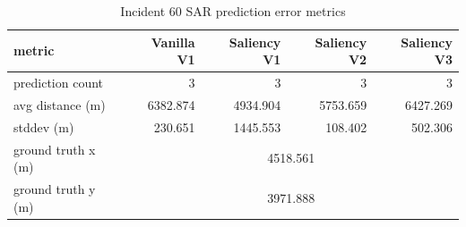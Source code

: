 \begin{table}[ht]
\centering
\caption{Incident 60 SAR prediction error metrics}
\label{tab:sar-incident-60}
\begin{tabular}{lrrrr}
\hline
metric & Vanilla V1 & Saliency V1 & Saliency V2 & Saliency V3 \\
\hline
prediction count & 3 & 3 & 3 & 3 \\
avg distance (m) & 6382.874 & 4934.904 & 5753.659 & 6427.269 \\
stddev (m) & 230.651 & 1445.553 & 108.402 & 502.306 \\
ground truth x (m) & \multicolumn{4}{c}{4518.561} \\
ground truth y (m) & \multicolumn{4}{c}{3971.888} \\
\hline
\end{tabular}
\end{table}
